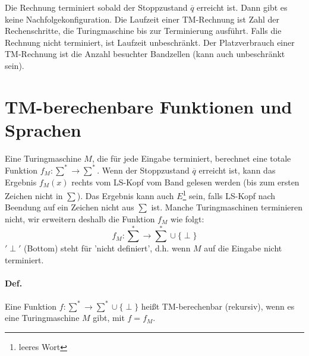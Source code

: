 \par\medskip
Die Rechnung terminiert sobald der Stoppzustand $\overline{q}$ erreicht ist. Dann gibt es keine Nachfolgekonfiguration. Die Laufzeit einer TM-Rechnung ist Zahl der Rechenschritte, die Turingmaschine bis zur Terminierung ausführt. Falls die Rechnung nicht terminiert, ist Laufzeit unbeschränkt. Der Platzverbrauch einer TM-Rechnung ist die Anzahl besuchter Bandzellen (kann auch unbeschränkt sein).
\par\medskip

\section{TM-berechenbare Funktionen und Sprachen}
Eine Turingmaschine $M$, die für jede Eingabe terminiert, berechnet eine totale Funktion $f_M:\sum^* \rightarrow \sum^*$. Wenn der Stoppzustand $\overline{q}$ erreicht ist, kann das Ergebnis $f_M(x)$ rechts vom LS-Kopf vom Band gelesen werden (bis zum ersten Zeichen nicht in $\sum$). Das Ergebnis kann auch $E$\footnote{leeres Wort} sein, falls LS-Kopf nach Beendung auf ein Zeichen nicht aus $\sum$ ist. Manche Turingmaschinen terminieren nicht, wir erweitern deshalb die Funktion $f_M$ wie folgt: $$ f_M:\sum\limits^* \rightarrow \sum\limits^* \cup \{ \perp \} $$ $'\perp'$ (Bottom) steht für 'nicht definiert', d.h. wenn $M$ auf die Eingabe nicht terminiert.

\paragraph*{Def.} Eine Funktion $f:\sum\limits^* \rightarrow \sum\limits^* \cup \{ \perp \}$ heißt TM-berechenbar (rekursiv), wenn es eine Turingmaschine $M$ gibt, mit $f=f_M$.